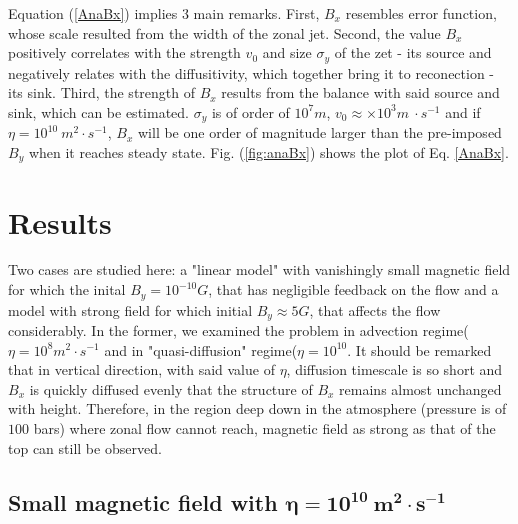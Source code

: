 \documentclass[11pt]{article}
\begin{document}
Equation (\ref{AnaBx}) implies 3 main remarks. First, $ B_x$  resembles error function, whose scale resulted from the width of the zonal jet. Second, the value $B_x$ positively correlates with the strength $v_{0}$ and size $\sigma_y$ of the zet - its source and negatively relates with the diffusitivity, which together bring it to reconection - its sink. Third, the strength of $B_x$ results from the balance with said source and sink, which can be estimated. $ \sigma_y$ is of order of $10^7 m$, $v_{0} \approx \times 10^3 m \ \cdot s^{-1}$ and if $\eta = 10^{10} \ m^2\cdot s^{-1} $, $B_x$ will be one order of magnitude larger than the pre-imposed $B_y$ when it reaches steady state. Fig. (\ref{fig:anaBx}) shows the plot of Eq. \ref{AnaBx}. 

\section{Results}
Two cases are studied here: a "linear model" with vanishingly small magnetic field for which the inital $B_y = 10^{-10} G$, that has negligible feedback on the flow and a model with strong field for which initial $B_y \approx 5G $, that affects the flow considerably. In the former, we examined the problem in advection regime($\eta = 10^8  m^2\cdot s^{-1}$ and in "quasi-diffusion" regime($\eta = 10^{10}$. It should be remarked that in vertical direction, with said value of $\eta$, diffusion timescale is so short and $B_x$ is quickly diffused evenly that the structure of $B_x$ remains almost unchanged with height. Therefore, in the region deep down in the atmosphere (pressure is of $100$ bars) where zonal flow cannot reach, magnetic field as strong as that of the top can still be observed.
\subsection{Small magnetic field with $ \boldsymbol{\eta} = \boldsymbol{10^{10}} \ \boldsymbol{m^2 \cdot s^{-1}}$}    \label{diffusionRegime}
\end{document}
